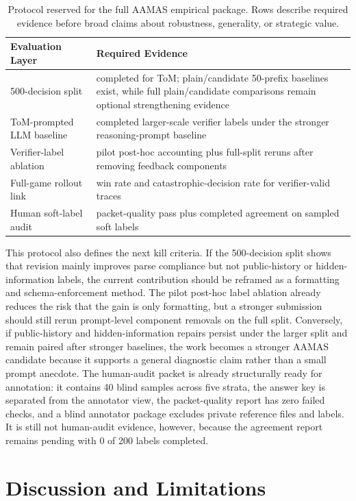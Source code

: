 \documentclass[sigconf,anonymous,review]{acmart}
\begin{document}
\begin{table}[!t]
\centering
\caption{Protocol reserved for the full AAMAS empirical package. Rows describe required evidence before broad claims about robustness, generality, or strategic value.}
\label{tab:full-protocol}
\scriptsize
\begin{tabularx}{\columnwidth}{lX}
\toprule
Evaluation Layer & Required Evidence \\
\midrule
500-decision split & completed for ToM; plain/candidate 50-prefix baselines exist, while full plain/candidate comparisons remain optional strengthening evidence \\
ToM-prompted LLM baseline & completed larger-scale verifier labels under the stronger reasoning-prompt baseline \\
Verifier-label ablation & pilot post-hoc accounting plus full-split reruns after removing feedback components \\
Full-game rollout link & win rate and catastrophic-decision rate for verifier-valid traces \\
Human soft-label audit & packet-quality pass plus completed agreement on sampled soft labels \\
\bottomrule
\end{tabularx}
\end{table}

This protocol also defines the next kill criteria. If the 500-decision split shows that revision mainly improves parse compliance but not public-history or hidden-information labels, the current contribution should be reframed as a formatting and schema-enforcement method. The pilot post-hoc label ablation already reduces the risk that the gain is only formatting, but a stronger submission should still rerun prompt-level component removals on the full split. Conversely, if public-history and hidden-information repairs persist under the larger split and remain paired after stronger baselines, the work becomes a stronger AAMAS candidate because it supports a general diagnostic claim rather than a small prompt anecdote. The human-audit packet is already structurally ready for annotation: it contains 40 blind samples across five strata, the answer key is separated from the annotator view, the packet-quality report has zero failed checks, and a blind annotator package excludes private reference files and labels. It is still not human-audit evidence, however, because the agreement report remains pending with 0 of 200 labels completed.

\section{Discussion and Limitations}
\end{document}
